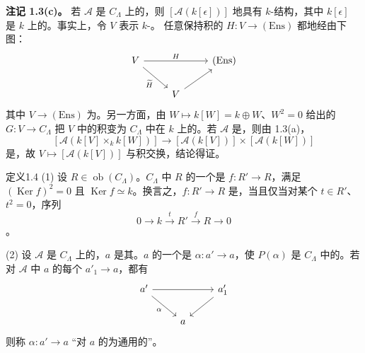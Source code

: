 \textbf{注记 1.3(c)。} 若 $\mathcal A$ 是 $C_\Lambda$ 上的，则 $[\mathcal A(k[\epsilon])]$ 地具有 $k$-结构，其中 $k[\epsilon]$ 是 $k$ 上的。事实上，令 $V$ 表示 $k$-。
任意保持积的 $H:V\to(\mathrm{Ens})$ 都地经由下图：
\[\begin{tikzcd}V\arrow[rr,"H"]\arrow[dr,"\widetilde H"']&&(\mathrm{Ens})\\&V\arrow[ur]&\end{tikzcd}\]
其中 $V\to(\mathrm{Ens})$ 为。另一方面，由 $W\mapsto k[W]=k\oplus W$、$W^2=0$ 给出的 $G:V\to C_\Lambda$ 把 $V$ 中的积变为 $C_\Lambda$ 中在 $k$ 上的。若 $\mathcal A$ 是，则由 1.3(a)，
\[[\mathcal A(k[V]\times_k k[W])]\longrightarrow[\mathcal A(k[V])]\times[\mathcal A(k[W])]\]
是，故 $V\mapsto[\mathcal A(k[V])]$ 与积交换，结论得证。
\begin{SGAresult}{定义}{1.4}
(1) 设 $R\in\operatorname{ob}(C_\Lambda)$。$C_\Lambda$ 中 $R$ 的一个是 $f:R'\to R$，满足 $(\operatorname{Ker}f)^2=0$ 且 $\operatorname{Ker}f\simeq k$。换言之，$f:R'\to R$ 是，当且仅当对某个 $t\in R'$、$t^2=0$，序列
\[0\longrightarrow k\xrightarrow{t}R'\xrightarrow fR\longrightarrow0\]
。

(2) 设 $\mathcal A$ 是 $C_\Lambda$ 上的，$a$ 是其。$a$ 的一个是 $\alpha:a'\to a$，使 $P(\alpha)$ 是 $C_\Lambda$ 中的。若对 $\mathcal A$ 中 $a$ 的每个 $a'_1\to a$，都有
\[\begin{tikzcd}a'\arrow[rr]\arrow[dr,"\alpha"']&&a'_1\arrow[dl]\\&a&\end{tikzcd}\]
则称 $\alpha:a'\to a$ “对 $a$ 的为通用的”。
\end{SGAresult}
